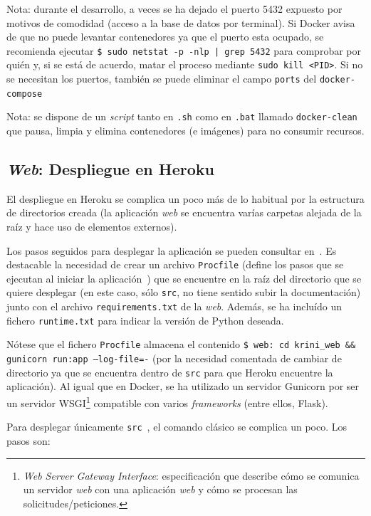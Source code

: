 Nota: durante el desarrollo, a veces se ha dejado el puerto 5432 expuesto por motivos de comodidad (acceso a la base de datos por terminal). Si Docker avisa de que no puede levantar contenedores ya que el puerto esta ocupado, se recomienda ejecutar \texttt{\$ sudo netstat -p -nlp | grep 5432} para comprobar por quién y, si se está de acuerdo, matar el proceso mediante \texttt{sudo kill <PID>}. Si no se necesitan los puertos, también se puede eliminar el campo \texttt{ports} del \texttt{docker-compose}

Nota: se dispone de un \textit{script} tanto en \texttt{.sh} como en \texttt{.bat} llamado \texttt{docker-clean} que pausa, limpia y elimina contenedores (e imágenes) para no consumir recursos.


\subsection{\textit{Web}: Despliegue en Heroku}

El despliegue en Heroku se complica un poco más de lo habitual por la estructura de directorios creada (la aplicación \textit{web} se encuentra varías carpetas alejada de la raíz y hace uso de elementos externos).

Los pasos seguidos para desplegar la aplicación se pueden consultar en~\cite{herokudeploy}. Es destacable la necesidad de crear un archivo \texttt{Procfile} (define los pasos que se ejecutan al iniciar la aplicación~\cite{herokuprocfile}) que se encuentre en la raíz del directorio que se quiere desplegar (en este caso, sólo \texttt{src}, no tiene sentido subir la documentación) junto con el archivo \texttt{requirements.txt} de la \textit{web}. Además, se ha incluído un fichero \texttt{runtime.txt} para indicar la versión de Python deseada.

Nótese que el fichero \texttt{Procfile} almacena el contenido \texttt{\$ web: cd krini\_web \&\& gunicorn run:app --log-file=-} (por la necesidad comentada de cambiar de directorio ya que se encuentra dentro de \texttt{src} para que Heroku encuentre la aplicación). Al igual que en Docker, se ha utilizado un servidor Gunicorn por ser un servidor WSGI\footnote{\textit{Web Server Gateway Interface}: especificación que describe cómo se comunica un servidor \textit{web} con una aplicación \textit{web} y cómo se procesan las solicitudes/peticiones.} compatible con varios \textit{frameworks} (entre ellos, Flask).

Para desplegar únicamente \texttt{src}~\cite{herokusubtree}, el comando clásico se complica un poco. Los pasos son:

